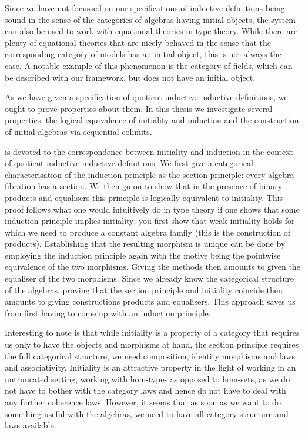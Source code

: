 Since we have not focussed on our specifications of inductive
definitions being sound in the sense of the categories of algebras
having initial objects, the system can also be used to work with
equational theories in type theory. While there are plenty of
equational theories that are nicely behaved in the sense that the
corresponding category of models has an initial object, this is not
always the case. A notable example of this phenomenon is the category
of fields, which can be described with our framework, but does not
have an initial object.

As we have given a specification of quotient inductive-inductive
definitions, we ought to prove properties about them. In this thesis
we investigate several properties: the logical equivalence of
initiality and induction and the construction of initial algebras via
sequential colimits.

 is devoted to the correspondence between initiality
and induction in the context of quotient inductive-inductive
definitions. We first give a categorical characterisation of the
induction principle as the section principle: every algebra fibration
has a section. We then go on to show that in the presence of binary
products and equalisers this principle is logically equivalent to
initiality. This proof follows what one would intuitively do in type
theory if one shows that some induction principle implies initiality:
you first show that weak initiality holds for which we need to produce
a constant algebra family (this is the construction of
products). Establishing that the resulting morphism is unique can be
done by employing the induction principle again with the motive being
the pointwise equivalence of the two morphisms. Giving the methods
then amounts to given the equaliser of the two morphisms. Since we
already know the categorical structure of the algebras, proving that
the section principle and initiality coincide then amounts to giving
constructions products and equalisers. This approach saves us from
first having to come up with an induction principle.

Interesting to note is that while initiality is a property of a
category that requires us only to have the objects and morphisms at
hand, the section principle requires the full categorical structure,
\ie we need composition, identity morphisms and laws and
associativity. Initiality is an attractive property in the light of
working in an untruncated setting, \ie working with hom-types as
opposed to hom-sets, as we do not have to bother with the category
laws and hence do not have to deal with any further coherence
laws. However, it seems that as soon as we want to do something useful
with the algebras, we need to have all category structure and laws
available.


